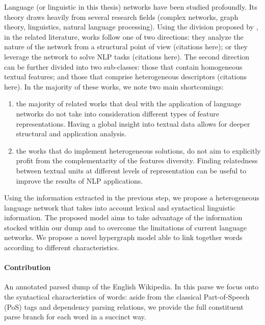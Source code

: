 Language (or linguistic in this thesis) networks  have been studied profoundly. Its theory draws heavily from several research fields (complex networks, graph theory, linguistics, natural language processing). Using the division proposed by \cite{Choudhury09}, in the related literature, works follow one of two directions: they analyze the nature of the network from a structural point of view (citations here); or they leverage the network to solve NLP tasks (citations here). The second direction can be further divided into two sub-classes: those that contain homogeneous textual features; and those that comprise heterogeneous descriptors (citations here). In the majority of these works, we note two main shortcomings:
\begin{enumerate}
\item the majority of related works that deal with the application of language networks do not take into consideration different types of feature representations. Having a global insight into textual data allows for deeper structural and application analysis.
\item the works that do implement heterogeneous solutions, do not aim to explicitly profit from the complementarity of the features diversity. Finding relatedness between textual units at different levels of representation can be useful to improve the results of NLP applications.

\end{enumerate}
 
Using the information extracted in the previous step, we propose a heterogeneous language network that takes into account lexical and syntactical linguistic information. The proposed model aims to take advantage of the information stocked within our dump and to overcome the limitations of current language networks. We propose a novel hypergraph model able to link together words according to different characteristics. 


\paragraph{Contribution}
An annotated parsed dump of the English Wikipedia. In this parse we focus  onto the syntactical characteristics of words: aside from the classical Part-of-Speech (PoS) tags and dependency parsing relations, we provide the full constituent parse branch for each word in a succinct way.  



